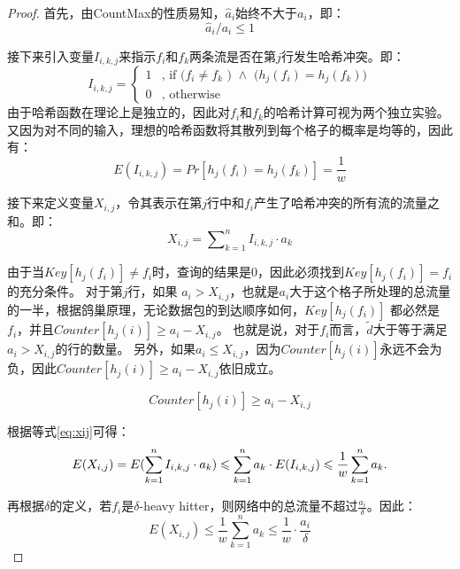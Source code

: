 \begin{proof}
首先，由CountMax的性质易知，$\hat{a}_i$始终不大于$a_i$，即：
\begin{equation}
    \hat{a}_i/{a_i} \le 1
\end{equation}

接下来引入变量$I_{i,k,j}$来指示$f_i$和$f_k$两条流是否在第$j$行发生哈希冲突。即：
\begin{equation}
    I_{i,k,j}=\left\{
    \begin{aligned}
    1&\text{, if ($f_i \ne f_k $ ) $\land $ ($h_j(f_i)=h_j(f_k)$)}\\
    0&\text{, otherwise}
    \end{aligned}
    \right.
\end{equation}
由于哈希函数在理论上是独立的，因此对$f_i$和$f_k$的哈希计算可视为两个独立实验。又因为对不同的输入，理想的哈希函数将其散列到每个格子的概率是均等的，因此有：
\begin{equation}
    E(I_{i,k,j})=Pr[h_j(f_i)=h_j(f_k)] = \frac{1}{w}
\end{equation}

接下来定义变量$X_{i,j}$，令其表示在第$j$行中和$f_i$产生了哈希冲突的所有流的流量之和。即：
\begin{equation}\label{eq:xij}
    X_{i,j}=\sum\nolimits_{k=1}^{n}I_{i,k,j}\cdot a_k
\end{equation}

由于当$Key[h_j(f_i)]\ne f_i$时，查询的结果是0，因此必须找到$Key[h_j(f_i)] = f_i$的充分条件。
对于第$j$行，如果 $a_i > X_{i,j}$，也就是$a_i$大于这个格子所处理的总流量的一半，根据鸽巢原理，无论数据包的到达顺序如何，$Key[h_j(f_i)]$ 都必然是 $f_i$，并且$Counter[h_j(i)]\ge a_i-X_{i,j}$。
也就是说，对于$f_i$而言，$\tilde{d}$大于等于满足$a_i > X_{i,j}$的行的数量。
另外，如果$a_i \le X_{i,j}$，因为$Counter[h_j(i)]$永远不会为负，因此$Counter[h_j(i)]\ge a_i-X_{i,j}$依旧成立。

\begin{equation}\label{eq:ai_xij}
    Counter[h_j(i)]\ge a_i-X_{i,j}
\end{equation}

根据等式\eqref{eq:xij}可得：
\begin{equation}\label{eq:ex}\notag
E(X_{i,j})=E(\sum_{k=1}^{n}I_{i,k,j}\cdot a_k)\le\sum_{k=1}^{n} a_k\cdot E(I_{i,k,j})\le \frac{1}{w}\sum_{k=1}^{n}a_k.
\end{equation}


再根据$\delta$的定义，若$f_i$是$\delta$-heavy hitter，则网络中的总流量不超过$\frac{a_i}{\delta}$。因此：
\begin{equation}\label{eq:ex-delta}
E(X_{i,j})\le \frac{1}{w}\sum_{k=1}^{n}a_k\le \frac{1}{w}\cdot \frac{a_i}{\delta}
\end{equation}


\end{proof}
